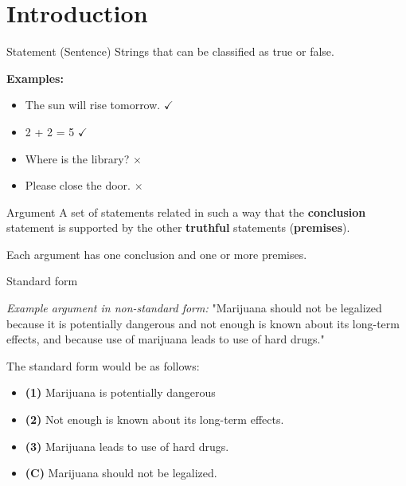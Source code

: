 \documentclass{article}
\begin{document}



\newpage
\hypertarget{toc}{}
\tableofcontents

\newpage


\section{Introduction}

\begin{definition}{Statement (Sentence)}
    Strings that can be classified as true or false.

    \tcblower

    \textbf{Examples:}
    \begin{itemize}
        \item The sun will rise tomorrow. $\checkmark$
        \item 2 + 2 = 5 $\checkmark$
        \item Where is the library? $\times$
        \item Please close the door. $\times$
    \end{itemize}
\end{definition}

\begin{definition}
    {Argument}
    A set of statements related in such a way that the \textbf{conclusion} statement is supported by the other \textbf{truthful} statements (\textbf{premises}).

    Each argument has one conclusion and one or more premises.
\end{definition}

\begin{theorem}{Standard form}

    \textit{Example argument in non-standard form:} "Marijuana should not be legalized because it is potentially dangerous and not enough is known about its long-term effects, and because use of marijuana leads to use of hard drugs."

    The standard form would be as follows:

    \begin{itemize}
        \item \textbf{(1)} Marijuana is potentially dangerous
        \item \textbf{(2)} Not enough is known about its long-term effects.
        \item \textbf{(3)} Marijuana leads to use of hard drugs.
        \item \textbf{(C)} Marijuana should not be legalized.
    \end{itemize}
\end{theorem}
\end{document}
